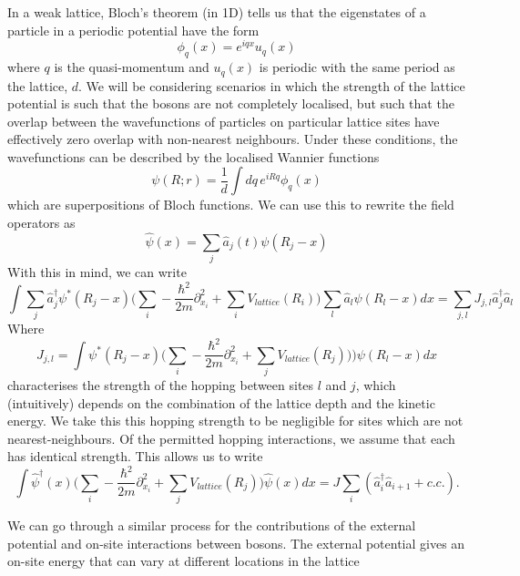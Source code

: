 \documentclass[a4paper,10pt]{article}
\begin{document}
In a weak lattice, Bloch's theorem (in 1D) tells us that the eigenstates of a particle in a periodic potential have the form
\begin{equation}
 \phi_q(x)=e^{iqx}u_{q}(x)
\end{equation}
where $q$ is the quasi-momentum and $u_q(x)$ is periodic with the same period as the lattice, $d$. We will be considering scenarios in which the strength of the lattice potential
is such that the bosons are not completely localised, but such that the overlap between the wavefunctions of particles on particular lattice sites have effectively zero overlap 
with non-nearest neighbours. Under these conditions, the wavefunctions can be described by the localised Wannier functions
\begin{equation}
\psi(R;r)=\frac{1}{d}\int dq\, e^{iRq}\phi_q(x)
\end{equation}
which are superpositions of Bloch functions. We can use this to rewrite the field operators as 
\begin{equation}
 \hat{\psi}(x)=\sum_j \hat{a}_{j}(t)\psi(R_j-x)
\end{equation}
With this in mind, we can write
\begin{equation}
 \int  \sum_j\hat{a}_j^{\dagger}\psi^{*}(R_j-x) \bigg(  \sum_{i}-\frac{\hbar^{2}}{2m}  \partial_{x_{i}}^2+\sum_{i}V_{lattice}(R_{i})  \bigg)  \sum_l  \hat{a}_l\psi(R_l-x)dx=\sum_{j,l} J_{j,l}\hat{a}_{j}^{\dagger}\hat{a}_l
\end{equation}
Where
\begin{equation}
 J_{j,l}=\int  \psi^{*}(R_j-x) \bigg(  \sum_{i}-\frac{\hbar^{2}}{2m}  \partial_{x_{i}}^2+\sum_{j}V_{lattice}(R_{j}))  \bigg)  \psi(R_l-x)dx
\end{equation}
characterises the strength of the hopping between sites $l$ and $j$, which (intuitively) depends on the combination of the lattice depth and the kinetic energy. We take this this hopping strength to be negligible
for sites which are not nearest-neighbours. Of the permitted hopping interactions, we assume that each has identical strength. This allows us to write
\begin{equation}
 \int  \hat{\psi}^{\dagger}(x) \bigg(  \sum_{i}-\frac{\hbar^{2}}{2m}  \partial_{x_{i}}^2+\sum_{j}V_{lattice}(R_{j})  \bigg)    \hat{\psi}(x)dx=J\sum_{i}(\hat{a}^\dagger_{i}\hat{a}_{i+1}+c.c.).
\end{equation}

We can go through a similar process for the contributions of the external potential and on-site interactions between bosons. The external potential gives an on-site energy that can vary
at different locations in the lattice
\end{document}

